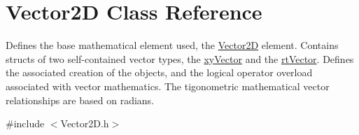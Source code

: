 \hypertarget{class_vector2_d}{}\section{Vector2D Class Reference}
\label{class_vector2_d}


Defines the base mathematical element used, the \hyperlink{class_vector2_d}{Vector2D} element. Contains structs of two self-\/contained vector types, the \hyperlink{structxy_vector}{xy\+Vector} and the \hyperlink{structrt_vector}{rt\+Vector}. Defines the associated creation of the objects, and the logical operator overload associated with vector mathematics. The tigonometric mathematical vector relationships are based on radians.  




{\ttfamily \#include $<$Vector2\+D.\+h$>$}

